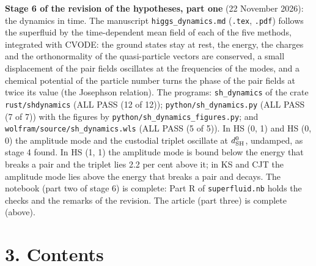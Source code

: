 \documentclass[
  10pt,
]{article}
\begin{document}
\textbf{Stage 6 of the revision of the hypotheses, part one} (22
November 2026): the dynamics in time. The manuscript
\texttt{higgs\_dynamics.md} (\texttt{.tex}, \texttt{.pdf}) follows the
superfluid by the time-dependent mean field of each of the five methods,
integrated with CVODE: the ground states stay at rest, the energy, the
charges and the orthonormality of the quasi-particle vectors are
conserved, a small displacement of the pair fields oscillates at the
frequencies of the modes, and a chemical potential of the particle
number turns the phase of the pair fields at twice its value (the
Josephson relation). The programs: \texttt{sh\_dynamics} of the crate
\texttt{rust/shdynamics} (ALL PASS (12 of 12));
\texttt{python/sh\_dynamics.py} (ALL PASS (7 of 7)) with the figures by
\texttt{python/sh\_dynamics\_figures.py}; and
\texttt{wolfram/source/sh\_dynamics.wls} (ALL PASS (5 of 5)). In HS (0,
1) and HS (0, 0) the amplitude mode and the custodial triplet oscillate
at \(d^0_{\rm SH}\), undamped, as stage 4 found. In HS (1, 1) the
amplitude mode is bound below the energy that breaks a pair and the
triplet lies 2.2 per cent above it; in KS and CJT the amplitude mode
lies above the energy that breaks a pair and decays. The notebook (part
two of stage 6) is complete: Part R of \texttt{superfluid.nb} holds the
checks and the remarks of the revision. The article (part three) is
complete (above).

\hypertarget{contents}{%
\section{3. Contents}\label{contents}}
\end{document}
